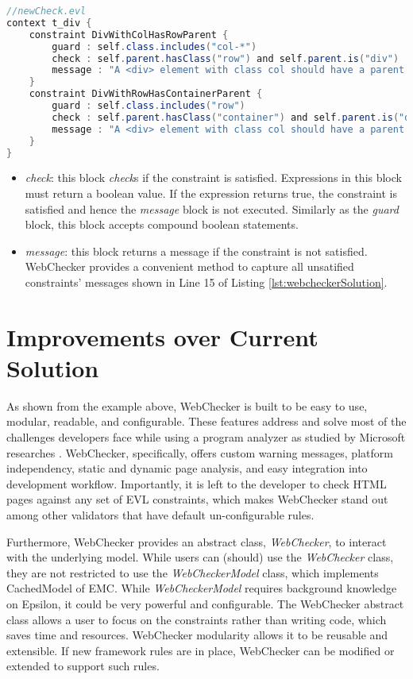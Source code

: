 \documentclass[conference]{IEEETran}
\begin{document}
\begin{lstlisting}[language=Java, caption=Enforcing Bootstrap Grid Rule by Using WebChecker, label={lst:webcheckerSolution}]
//newCheck.evl
context t_div { 
    constraint DivWithColHasRowParent {
        guard : self.class.includes("col-*")
        check : self.parent.hasClass("row") and self.parent.is("div")
        message : "A <div> element with class col should have a parent <div> element with class row."
    }
    constraint DivWithRowHasContainerParent {
        guard : self.class.includes("row")
        check : self.parent.hasClass("container") and self.parent.is("div")
        message : "A <div> element with class col should have a parent <div> element with class row."
    }
}

\end{lstlisting}

\begin{itemize}
\item \textit{check}: this block \textit{check}s if the constraint is satisfied. Expressions in this block must return a boolean value. If the expression returns true, the constraint is satisfied and hence the \textit{message} block is not executed. Similarly as the \textit{guard} block, this block accepts compound boolean statements.
\item \textit{message}: this block returns a message if the constraint is not satisfied. WebChecker provides a convenient method to capture all unsatified constraints' messages shown in Line 15 of Listing \ref{lst:webcheckerSolution}.  
\end{itemize}

\section{Improvements over Current Solution}
As shown from the example above, WebChecker is built to be easy to use, modular, readable, and configurable. These features address and solve most of the challenges developers face while using a program analyzer as studied by Microsoft researches \cite{christakis16}. WebChecker, specifically, offers custom warning messages, platform independency, static and dynamic page analysis, and easy integration into development workflow. Importantly, it is left to the developer to check HTML pages against any set of EVL constraints, which makes WebChecker stand out among other validators that have default un-configurable rules.    

Furthermore, WebChecker provides an abstract class, \textit{WebChecker},  to interact with the underlying model. While users can (should) use the \textit{WebChecker} class, they are not restricted to use the \textit{WebCheckerModel} class, which implements CachedModel of EMC. While \textit{WebCheckerModel} requires background knowledge on Epsilon, it could be very powerful and configurable. The WebChecker abstract class allows a user to focus on the constraints rather than writing code, which saves time and resources. WebChecker modularity allows it to be reusable and extensible. If new framework rules are in place, WebChecker can be modified or extended to support such rules. 
\end{document}
